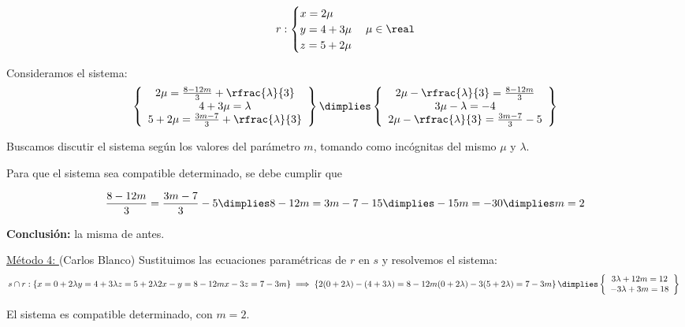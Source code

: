 \documentclass[palatino,nosec,nochap,nobuilddate]{Docencia}
\begin{document}
\begin{problem}
\[
r:\begin{cases} 
x = 2\mu\\
y = 4+3\mu\\
z = 5+2\mu
\end{cases}\mu\in\real
\]

Consideramos el sistema:
\[\left\{
\begin{array}{c}
	2\mu = \frac{8-12m}{3} + \rfrac{\lambda}{3}\\
	4+3\mu = \lambda \\
	5+2\mu = \frac{3m-7}{3} + \rfrac{\lambda}{3}
\end{array}\right\} \dimplies \left\{
\begin{array}{c}
	2\mu-\rfrac{\lambda}{3} = \frac{8-12m}{3}\\
	3\mu-\lambda = -4\\
	2\mu-\rfrac{\lambda}{3} = \frac{3m-7}{3}-5
\end{array}\right\}
\]

Buscamos discutir el sistema según los valores del parámetro $m$, tomando como incógnitas del mismo $\mu$ y $\lambda$.

Para que el sistema sea compatible determinado, se debe cumplir que 

\[
\frac{8-12m}{3} = \frac{3m-7}{3}-5 \dimplies 8-12m = 3m-7-15 \dimplies -15m=-30 \dimplies m=2
\]

\textbf{Conclusión:} la misma de antes.

\ul{Método 4: } (Carlos Blanco)
Sustituimos las ecuaciones paramétricas de $r$ en $s$ y resolvemos el sistema:
\[
s\cap r: 
\left\{
	x = 0+2\lambda\\
	y = 4+3\lambda\\
	z = 5+2\lambda\\
	2x-y=8-12m\\
	x-3z = 7-3m	
\right\}\implies
\left\{
	2(0+2\lambda)-(4+3\lambda)=8-12m\\
	(0+2\lambda)-3(5+2\lambda) = 7-3m	
\right\} \dimplies 
\left\{
	\begin{array}{c}
		3\lambda + 12m = 12\\
		-3\lambda + 3m = 18
	\end{array}	
\right\}\
\]

El sistema es compatible determinado, con $m=2$.

\end{problem}
\end{document}
